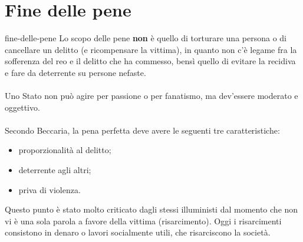 \documentclass[preview]{standalone}
\begin{document}
\genpage

\section{Fine delle pene}

\begin{snippet}{fine-delle-pene}
    Lo scopo delle pene \textbf{non} è
    quello di torturare una persona o di cancellare un delitto
    (e ricompensare la vittima), in quanto non c'è legame fra la sofferenza
    del reo e il delitto che ha commesso, bensì quello di
    evitare la recidiva e fare da deterrente su persone nefaste.
    \\\\
    Uno Stato non può agire per passione o per fanatismo, ma dev'essere moderato
    e oggettivo.
    \\\\
    Secondo Beccaria, la pena perfetta deve avere le seguenti tre caratteristiche:
    \begin{itemize}
        \item proporzionalità al delitto;
        \item deterrente agli altri;
        \item priva di violenza.
    \end{itemize}
    Questo punto è stato molto criticato dagli stessi illuministi
    dal momento che non vi è una sola parola a favore della vittima (risarcimento).
    Oggi i risarcimenti consistono in denaro o lavori socialmente utili, che risarciscono
    la società.
    
\end{snippet}
\end{document}
